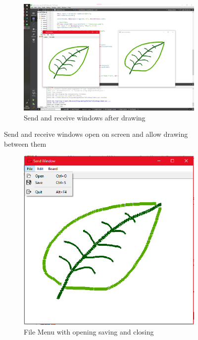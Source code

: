 \documentclass[10pt]{article}
\newcommand{\figsquish}{\vspace{-5mm}} %
\begin{document}
\begin{multicols*}{2}
\begin{figure}[H]
\begin{subfigure}[t]{0.48\columnwidth}
		\includegraphics[width=\columnwidth]{./application drawing.png}
		\caption{Send and receive windows after drawing}
		\label{fig:app-drawing}
	\end{subfigure}
	\caption{Send and receive windows open on screen and allow drawing between them}
	\label{fig:application}
\end{figure}
\figsquish

\begin{figure}[H]
	\centering
	\begin{subfigure}[t]{0.32\columnwidth}

		\includegraphics[width=\columnwidth]{./file.png}
		\caption{File Menu with  opening saving and closing}
		\label{fig:file}
	\end{subfigure}
	\hfill
	\begin{subfigure}[t]{0.32\columnwidth}


\end{subfigure}
\end{figure}
\end{multicols*}
\end{document}
